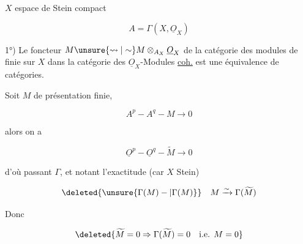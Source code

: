 $X$ espace de Stein compact

\[
 A=\Gamma(X,\underline O_X)
\]


1°) Le foncteur $M\unsure{\leadsto|\sim} M\otimes_{A_X}\underline O_X$ de la catégorie des modules de   finie sur $X$ dans la catégorie des $\underline O_X$-Modules \uline{coh.} est une équivalence de catégories.


Soit $M$ de présentation finie,

\[
 A^p - A^q - M \to 0
\]

alors on a

\[
 \underline O^p - \underline O^q - \widetilde M \to 0
\]

d'où passant  $\Gamma$, et notant l'exactitude (car $X$ Stein)

\[
 \deleted{\unsure{\Gamma(M)-|\Gamma(M)}} \quad M\xrightarrow{\sim}\Gamma(\widetilde M)
\]

Donc  

\[
 \deleted{\widetilde M=0\Rightarrow\Gamma(\widetilde M)=0\quad\text{i.e. }M=0}
\]
